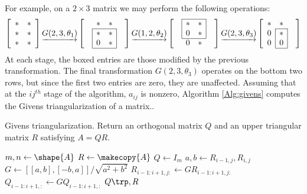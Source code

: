 For example, on a $2 \times 3$ matrix we may perform the following operations:
\[
\left[\begin{array}{cc}
* & * \\
* & * \\
* & * \\
\end{array}\right]
\underrightarrow{G(2,3,\theta_1)}
\left[\begin{array}{cccc}
&      *  &      *  & \\
\cline{2-3}
& \lvl{*} & \rvl{*} & \\
& \lvl{0} & \rvl{*} & \\
\cline{2-3}
\end{array}\right]
\underrightarrow{G(1,2,\theta_2)}
\left[\begin{array}{cccc}
\cline{2-3}
& \lvl{*} & \rvl{*} & \\
& \lvl{0} & \rvl{*} & \\
\cline{2-3}
&      0  &      *  & \\
\end{array}\right]
\underrightarrow{G(2,3,\theta_3)}
\left[\begin{array}{ccc}
     * &       *  & \\
\cline{2-2}
\rvl{0} & \rvl{*} & \\
\rvl{0} & \rvl{0} & \\
\cline{2-2}
\end{array}\right]
\]
At each stage, the boxed entries are those modified by the previous transformation.
The final transformation $G(2,3,\theta_3)$ operates on the bottom two rows, but since the first two entries are zero, they are unaffected.
Assuming that at the $ij^{th}$ stage of the algorithm, $a_{ij}$ is nonzero, Algorithm \ref{Alg:givens} computes the Givens triangularization of a matrix..


\begin{algorithm}
\begin{algorithmic}[1]
\caption{Givens triangularization. Return an orthogonal matrix $Q$ and an upper triangular matrix $R$ satisfying $A = QR$.}
\label{Alg:givens}
\State $m, n \gets \shape{A}$
\State $R \gets \makecopy{A}$
\State $Q \gets I_{m}$
      \State $a, b \gets R_{i-1,j}, R_{i,j}$
      \State $G \gets [[a, b],[-b,a]]/\sqrt{a^2+b^2}$
      \State $R_{i-1:i+1,j:} \gets GR_{i-1:i+1, j:}$
      \State $Q_{i-1:i+1,:} \gets GQ_{i-1:i+1,:}$
    \EndFor
\EndFor
\State {} $Q\trp , R$
\EndProcedure
\end{algorithmic}
\end{algorithm}


